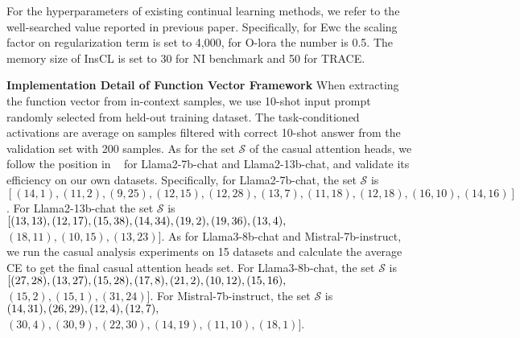 For the hyperparameters of existing continual learning methods, we refer to the well-searched value reported in previous paper. Specifically, for Ewc the scaling factor on regularization term is set to 4,000, for O-lora the number is 0.5. The memory size of InsCL is set to 30 for NI benchmark and 50 for TRACE.


\textbf{Implementation Detail of Function Vector Framework}
When extracting the function vector from in-context samples, we use 10-shot input prompt randomly selected from held-out training dataset. The task-conditioned activations are average on samples filtered with correct 10-shot answer from the validation set with 200 samples. As for the set $\mathcal{S}$ of the casual attention heads, we follow the position in ~\citet{todd2023function} for Llama2-7b-chat and Llama2-13b-chat, and validate its efficiency on our own datasets. Specifically, for Llama2-7b-chat, the set $\mathcal{S}$ is $[(14, 1), (11, 2), (9, 25), (12, 15), (12, 28), (13, 7),(11, 18), (12, 18), (16, 10), (14, 16)]$. For Llama2-13b-chat the set $\mathcal{S}$ is $[(13, 13), (12, 17), (15, 38), (14, 34), (19, 2), (19, 36), (13, 4),\\ $$(18, 11), (10, 15), (13, 23)]$.
As for Llama3-8b-chat and Mistral-7b-instruct, we run the casual analysis experiments on 15 datasets and calculate the average CE to get the final casual attention heads set.
For Llama3-8b-chat, the set $\mathcal{S}$ is $
[(27, 28), (13, 27), (15, 28), (17, 8), (21, 2), (10, 12), (15, 16), \\$$(15, 2), (15, 1), (31, 24)]$. For Mistral-7b-instruct, the set $\mathcal{S}$ is $(14, 31), (26, 29), (12, 4), (12, 7), \\$$ (30, 4), (30, 9), (22, 30), (14, 19), (11, 10), (18, 1)]$.


